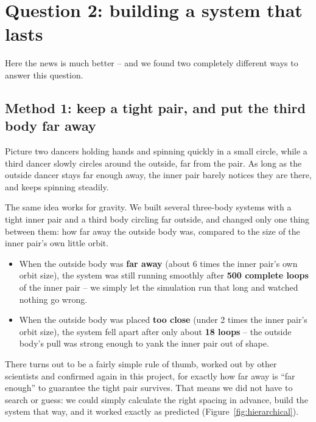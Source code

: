 \documentclass[11pt]{article}
\begin{document}
\section{Question 2: building a system that lasts}

Here the news is much better -- and we found two completely different
ways to answer this question.

\subsection*{Method 1: keep a tight pair, and put the third body far away}

Picture two dancers holding hands and spinning quickly in a small circle,
while a third dancer slowly circles around the outside, far from the
pair. As long as the outside dancer stays far enough away, the inner pair
barely notices they are there, and keeps spinning steadily.

The same idea works for gravity. We built several three-body systems with
a tight inner pair and a third body circling far outside, and changed only
one thing between them: how far away the outside body was, compared to
the size of the inner pair's own little orbit.

\begin{itemize}
  \item When the outside body was \textbf{far away} (about 6 times the
    inner pair's own orbit size), the system was still running smoothly
    after \textbf{500 complete loops} of the inner pair -- we simply let
    the simulation run that long and watched nothing go wrong.
  \item When the outside body was placed \textbf{too close} (under 2
    times the inner pair's orbit size), the system fell apart after only
    about \textbf{18 loops} -- the outside body's pull was strong enough
    to yank the inner pair out of shape.
\end{itemize}

There turns out to be a fairly simple rule of thumb, worked out by other
scientists and confirmed again in this project, for exactly how far away
is ``far enough'' to guarantee the tight pair survives. That means we did
not have to search or guess: we could simply calculate the right spacing
in advance, build the system that way, and it worked exactly as predicted
(Figure~\ref{fig:hierarchical}).
\end{document}
